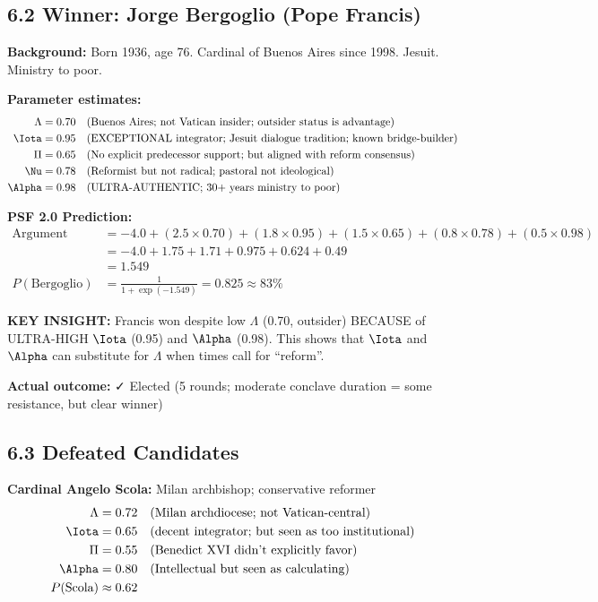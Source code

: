 \subsection{6.2 Winner: Jorge Bergoglio (Pope Francis)}

\textbf{Background:} Born 1936, age 76. Cardinal of Buenos Aires since 1998. Jesuit. Ministry to poor.

\textbf{Parameter estimates:}
\begin{align*}
\Lambda &= 0.70 \quad \text{(Buenos Aires; not Vatican insider; outsider status is advantage)} \\
\Iota &= 0.95 \quad \text{(EXCEPTIONAL integrator; Jesuit dialogue tradition; known bridge-builder)} \\
\Pi &= 0.65 \quad \text{(No explicit predecessor support; but aligned with reform consensus)} \\
\Nu &= 0.78 \quad \text{(Reformist but not radical; pastoral not ideological)} \\
\Alpha &= 0.98 \quad \text{(ULTRA-AUTHENTIC; 30+ years ministry to poor)}
\end{align*}

\textbf{PSF 2.0 Prediction:}
\begin{align*}
\text{Argument} &= -4.0 + (2.5 \times 0.70) + (1.8 \times 0.95) + (1.5 \times 0.65) + (0.8 \times 0.78) + (0.5 \times 0.98) \\
&= -4.0 + 1.75 + 1.71 + 0.975 + 0.624 + 0.49 \\
&= 1.549 \\
P(\text{Bergoglio}) &= \frac{1}{1 + \exp(-1.549)} = 0.825 \approx 83\%
\end{align*}

\textbf{KEY INSIGHT:} Francis won despite low $\Lambda$ (0.70, outsider) BECAUSE of ULTRA-HIGH $\Iota$ (0.95) and $\Alpha$ (0.98). This shows that $\Iota$ and $\Alpha$ can substitute for $\Lambda$ when times call for ``reform''.

\textbf{Actual outcome:} ✓ Elected (5 rounds; moderate conclave duration = some resistance, but clear winner)

\subsection{6.3 Defeated Candidates}

\textbf{Cardinal Angelo Scola:} Milan archbishop; conservative reformer
\begin{align*}
\Lambda &= 0.72 \quad \text{(Milan archdiocese; not Vatican-central)} \\
\Iota &= 0.65 \quad \text{(decent integrator; but seen as too institutional)} \\
\Pi &= 0.55 \quad \text{(Benedict XVI didn't explicitly favor)} \\
\Alpha &= 0.80 \quad \text{(Intellectual but seen as calculating)} \\
P(\text{Scola}) &\approx 0.62
\end{align*}

